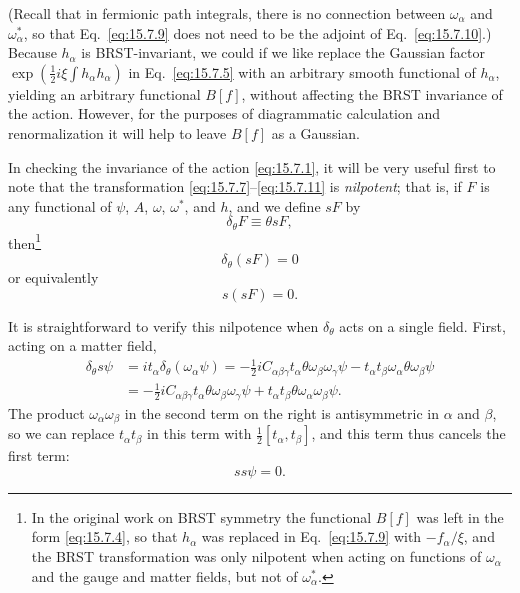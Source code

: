 (Recall that in fermionic path integrals, there is no connection between $\omega_\alpha$ and $\omega_\alpha^*$, so that Eq.~\eqref{eq:15.7.9} does not need to be the adjoint of Eq.~\eqref{eq:15.7.10}.) Because $h_\alpha$ is BRST-invariant, we could if we like replace the Gaussian factor $\exp(\tfrac{1}{2}i\xi\int h_\alpha h_\alpha)$ in Eq.~\eqref{eq:15.7.5} with an arbitrary smooth functional of $h_\alpha$, yielding an arbitrary functional $B[f]$, without affecting the BRST invariance of the action. However, for the purposes of diagrammatic calculation and renormalization it will help to leave $B[f]$ as a Gaussian.

In checking the invariance of the action \eqref{eq:15.7.1}, it will be very useful first to note that the transformation \eqref{eq:15.7.7}--\eqref{eq:15.7.11} is \emph{nilpotent}; that is, if $F$ is any functional of $\psi$, $A$, $\omega$, $\omega^*$, and $h$, and we define $sF$ by
\begin{equation}
 \delta_\theta F\equiv\theta sF,
 \tag{15.7.12}\label{eq:15.7.12}
\end{equation}
then\footnote{In the original work on BRST symmetry the functional $B[f]$ was left in the form \eqref{eq:15.7.4}, so that $h_\alpha$ was replaced in Eq.~\eqref{eq:15.7.9} with $-f_\alpha/\xi$, and the BRST transformation was only nilpotent when acting on functions of $\omega_\alpha$ and the gauge and matter fields, but not of $\omega_\alpha^*$.}
\begin{equation}
 \delta_\theta(sF)=0
 \tag{15.7.13}\label{eq:15.7.13}
\end{equation}
or equivalently
\begin{equation}
 s(sF)=0.
 \tag{15.7.14}\label{eq:15.7.14}
\end{equation}

It is straightforward to verify this nilpotence when $\delta_\theta$ acts on a single field. First, acting on a matter field,
\begin{align*}
 \delta_\theta s\psi
 &=it_\alpha\delta_\theta(\omega_\alpha\psi)
 =-\frac{1}{2}iC_{\alpha\beta\gamma}t_\alpha\theta\omega_\beta\omega_\gamma\psi
 -t_\alpha t_\beta\omega_\alpha\theta\omega_\beta\psi\\
 &=-\frac{1}{2}iC_{\alpha\beta\gamma}t_\alpha\theta\omega_\beta\omega_\gamma\psi
 +t_\alpha t_\beta\theta\omega_\alpha\omega_\beta\psi.
\end{align*}
The product $\omega_\alpha\omega_\beta$ in the second term on the right is antisymmetric in $\alpha$ and $\beta$, so we can replace $t_\alpha t_\beta$ in this term with $\tfrac{1}{2}[t_\alpha,t_\beta]$, and this term thus cancels the first term:
\begin{equation}
 ss\psi=0.
 \tag{15.7.15}\label{eq:15.7.15}
\end{equation}


